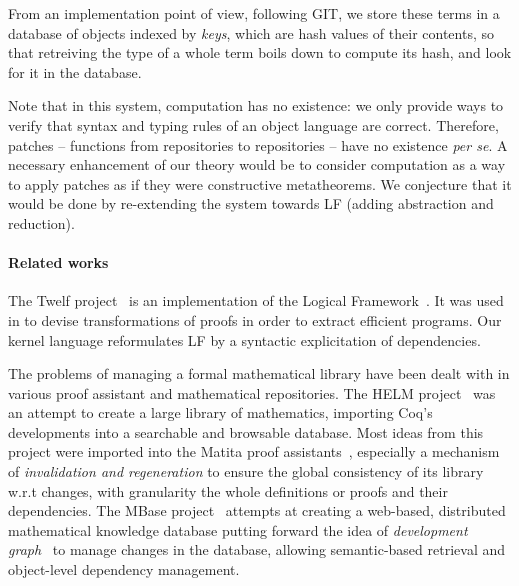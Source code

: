 \documentclass{article}
\begin{document}
From an implementation point of view, following \textsf{GIT}, we store
these terms in a database of objects indexed by \emph{keys}, which are
hash values of their contents, so that retreiving the type of a whole
term boils down to compute its hash, and look for it in the database.

Note that in this system, computation has no existence: we only
provide ways to verify that syntax and typing rules of an object
language are correct. Therefore, patches -- functions from
repositories to repositories -- have no existence \emph{per se}. A
necessary enhancement of our theory would be to consider computation
as a way to apply patches as if they were constructive
metatheorems. We conjecture that it would be done by re-extending the
system towards LF (adding abstraction and reduction).

\paragraph{Related works}
\label{rw}

The \textsf{Twelf} project~\citep{pfenning1999system} is an
implementation of the Logical
Framework~\citep{harper1993framework}. It was used in
\citep{anderson1993program} to devise transformations of proofs in
order to extract efficient programs. Our kernel language reformulates
LF by a syntactic explicitation of dependencies.

The problems of managing a formal mathematical library have been dealt
with in various proof assistant and mathematical repositories. The
HELM project~\citep{asperti2006content} was an attempt to create a
large library of mathematics, importing \textsf{Coq}'s developments
into a searchable and browsable database.  Most ideas from this
project were imported into the \textsf{Matita} proof
assistants~\citep{AspertiCTZ07}, especially a mechanism of
\emph{invalidation and regeneration} to ensure the global consistency
of its library w.r.t changes, with granularity the whole definitions
or proofs and their dependencies. The MBase
project~\citep{kohlhase2001mbase} attempts at creating a web-based,
distributed mathematical knowledge database putting forward the idea
of \emph{development
  graph}~\citep{hutter2000management,autexier2000towards} to manage
changes in the database, allowing semantic-based retrieval and
object-level dependency management. 
\end{document}
